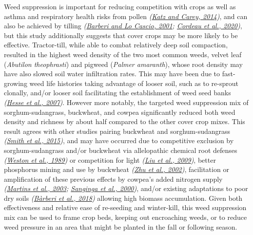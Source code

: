 \documentclass[
  12pt,
]{article}
\begin{document}
Weed suppression is important for reducing competition with crops as well as asthma and respiratory health risks from pollen \emph{(\protect\hyperlink{ref-katz14}{Katz and Carey, 2014})}, and can also be achieved by tilling \emph{(\protect\hyperlink{ref-barberi01}{Barberi and Lo Cascio, 2001}; \protect\hyperlink{ref-cordeau20}{Cordeau et al., 2020})}, but this study additionally suggests that cover crops may be more likely to be effective.
Tractor-till, while able to combat relatively deep soil compaction, resulted in the highest weed density of the two most common weeds, velvet leaf (\emph{Abutilon theophrasti}) and pigweed (\emph{Palmer amaranth}), whose root density may have also slowed soil water infiltration rates.
This may have been due to fast-growing weed life histories taking advantage of looser soil, such as to re-sprout clonally, and/or looser soil facilitating the establishment of weed seed banks \emph{(\protect\hyperlink{ref-hesse07}{Hesse et al., 2007})}.
However more notably, the targeted weed suppression mix of sorghum-sudangrass, buckwheat, and cowpea significantly reduced both weed density and richness by about half compared to the other cover crop mixes.
This result agrees with other studies pairing buckwheat and sorghum-sudangrass \emph{(\protect\hyperlink{ref-smith15}{Smith et al., 2015})}, and may have occurred due to competitive exclusion by sorghum-sudangrass and/or buckwheat via allelopathic chemical root defenses \emph{(\protect\hyperlink{ref-weston89}{Weston et al., 1989})} or competition for light \emph{(\protect\hyperlink{ref-liu09b}{Liu et al., 2009})}, better phosphorus mining and use by buckwheat \emph{(\protect\hyperlink{ref-zhu02}{Zhu et al., 2002})}, facilitation or amplification of these previous effects by cowpea's added nitrogen supply \emph{(\protect\hyperlink{ref-martins03}{Martins et al., 2003}; \protect\hyperlink{ref-sanginga00}{Sanginga et al., 2000})}, and/or existing adaptations to poor dry soils \emph{(\protect\hyperlink{ref-barberi18}{Bàrberi et al., 2018})} allowing high biomass accumulation.
Given both effectiveness and relative ease of re-seeding and winter-kill, this weed suppression mix can be used to frame crop beds, keeping out encroaching weeds, or to reduce weed pressure in an area that might be planted in the fall or following season.
\end{document}
